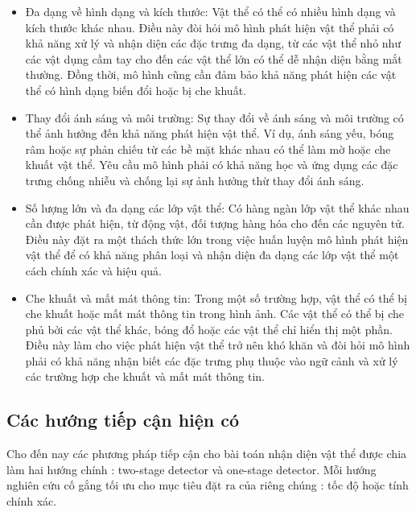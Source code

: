 \documentclass[a4paper]{article}
\begin{document}
\begin{itemize}
	\item Đa dạng về hình dạng và kích thước: Vật thể có thể có nhiều hình dạng và kích thước khác nhau. Điều này đòi hỏi mô hình phát hiện vật thể phải có khả năng xử lý và nhận diện các đặc trưng đa dạng, từ các vật thể nhỏ như các vật dụng cầm tay cho đến các vật thể lớn có thể dễ nhận diện bằng mắt thường. Đồng thời, mô hình cũng cần đảm bảo khả năng phát hiện các vật thể có hình dạng biến đổi hoặc bị che khuất.

	\item Thay đổi ánh sáng và môi trường: Sự thay đổi về ánh sáng và môi trường có thể ảnh hưởng đến khả năng phát hiện vật thể. Ví dụ, ánh sáng yếu, bóng râm hoặc sự phản chiếu từ các bề mặt khác nhau có thể làm mờ hoặc che khuất vật thể. Yêu cầu mô hình phải có khả năng học và ứng dụng các đặc trưng chống nhiễu và chống lại sự ảnh hưởng thừ thay đổi ánh sáng.

	\item Số lượng lớn và đa dạng các lớp vật thể: Có hàng ngàn lớp vật thể khác nhau cần được phát hiện, từ động vật, đối tượng hàng hóa cho đến các nguyên tử. Điều này đặt ra một thách thức lớn trong việc huấn luyện mô hình phát hiện vật thể để có khả năng phân loại và nhận diện đa dạng các lớp vật thể một cách chính xác và hiệu quả.

	\item Che khuất và mất mát thông tin: Trong một số trường hợp, vật thể có thể bị che khuất hoặc mất mát thông tin trong hình ảnh. Các vật thể có thể bị che phủ bởi các vật thể khác, bóng đổ hoặc các vật thể chỉ hiển thị một phần. Điều này làm cho việc phát hiện vật thể trở nên khó khăn và đòi hỏi mô hình phải có khả năng nhận biết các đặc trưng phụ thuộc vào ngữ cảnh và xử lý các trường hợp che khuất và mất mát thông tin.
\end{itemize}

\subsection{\textbf{Các hướng tiếp cận hiện có}}
Cho đến nay các phương pháp tiếp cận cho bài toán nhận diện vật thể được chia làm hai hướng chính : two-stage detector và one-stage detector. Mỗi hướng nghiên cứu cố gắng tối ưu cho mục tiêu đặt ra của riêng chúng : tốc độ hoặc tính chính xác.
\end{document}
